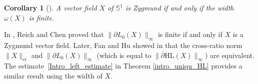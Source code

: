 \documentclass[10pt]{amsart}
\theoremstyle{plain}
\newtheorem{cor}{Corollary}[section]
\theoremstyle{definition}
\begin{document}
\begin{cor}[{\cite[Th.\,1.3 \& Eq.\,(96)]{diaf2023Infearth}}]\label{Cor_diaf_inf}
A vector field $X$ of $\mathbb{S}^1$ is Zygmund if and only if the width $\omega(X)$ is finite.
\end{cor}

In \cite{Extension_with_bounded_derivative}, Reich and Chen proved that \(\lVert \partial L_0(X) \rVert_{\infty} \) is finite if and only if \(X \) is a Zygmund vector field. Later, Fan and Hu showed in \cite{FanJun} that the cross-ratio norm~\(\lVert X \rVert_\mathrm{cr} \) and \(\lVert \partial L_0(X) \rVert_{\infty} \) (which is equal to \(\lVert \overline{\partial} \mathrm{HL}(X) \rVert_{\infty} \)) are equivalent. The estimate~\eqref{Intro_left_estimate} in Theorem \ref{intro_uniqu_HL} provides a similar result using the width of \(X \).
\end{document}
